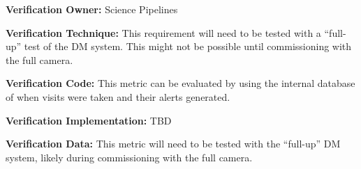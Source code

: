 \documentclass[DM,lsstdraft,toc]{lsstdoc}
\begin{document}
\textbf{Verification Owner:} Science Pipelines

\textbf{Verification Technique:} This requirement will need to be tested
with a ``full-up'' test of the DM system. This might not be possible
until commissioning with the full camera.

\textbf{Verification Code:} This metric can be evaluated by using the
internal database of when visits were taken and their alerts generated.

\textbf{Verification Implementation:} TBD

\textbf{Verification Data:} This metric will need to be tested with the
``full-up'' DM system, likely during commissioning with the full camera.


\end{document}
